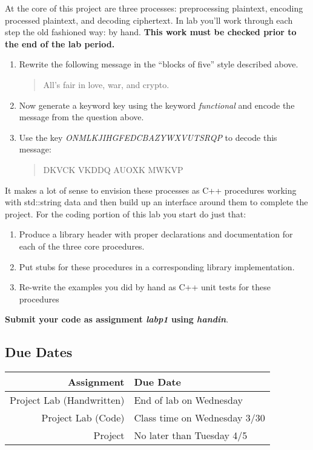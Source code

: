 \documentclass[]{tufte-handout}
\begin{document}
At the core of this project are three processes: preprocessing plaintext, encoding processed plaintext, and decoding ciphertext. In lab you'll work through each step the old fashioned way: by hand. \textbf{This work must be checked prior to the end of the lab period.}
\begin{enumerate}
\item Rewrite the following message in the ``blocks of five'' style described above.
\begin{quote}
All's fair in love, war, and crypto.
\end{quote}
\item Now generate a keyword key using the keyword \textit{functional} and encode the message from the question above.
\item Use the key \textit{ONMLKJIHGFEDCBAZYWXVUTSRQP} to decode this message:
\begin{quote}
DKVCK VKDDQ AUOXK MWKVP
\end{quote}
\end{enumerate}

It makes a lot of sense to envision these processes as C++ procedures working with std::string data and then build up an interface around them to complete the project. For the coding portion of this lab you start do just that: 
\begin{enumerate}
\item Produce a library header with proper declarations and documentation for each of the three core procedures.
\item Put stubs for these procedures in a corresponding library implementation.
\item Re-write the examples you did by hand as C++ unit tests for these procedures 
\end{enumerate}
\textbf{Submit your code as assignment \textit{labp1} using \textit{handin}}.

\subsection{Due Dates}

\begin{center}
\begin{tabular}{rl}
Assignment & Due Date \\ \hline
Project Lab (Handwritten) & End of lab on Wednesday \\
Project Lab (Code) & Class time on Wednesday 3/30 	\\
Project & No later than Tuesday 4/5
\end{tabular}
\end{center}
\end{document}
